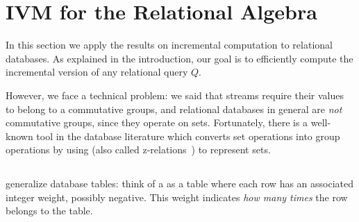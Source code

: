 \section{IVM for the Relational Algebra}\label{sec:relational}

In this section we apply the results on incremental computation to
relational databases.  As explained in the introduction, our goal is
to efficiently compute the incremental version of any relational query
$Q$.

However, we face a technical problem: we said that streams require
their values to belong to a commutative groups, and relational
databases in general are \emph{not} commutative groups, since they
operate on sets.  Fortunately, there is a well-known tool in the
database literature which converts set operations into group
operations by using \zrs (also called z-relations~\cite{green-tcs11})
to represent sets.

\subsection{\zrs}

\zrs generalize database tables: think of a \zr as a table where each
row has an associated integer weight, possibly negative.  This weight
indicates \emph{how many times} the row belongs to the table.

%


